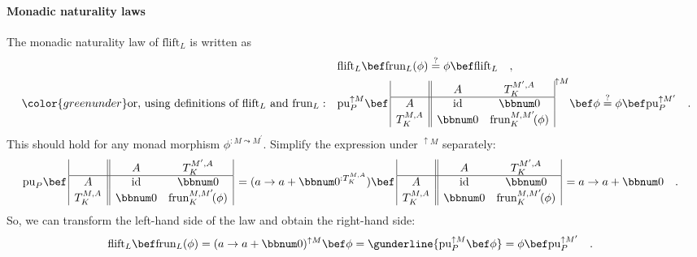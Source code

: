 \paragraph{Monadic naturality laws}

The monadic naturality law of $\text{flift}_{L}$ is written as
\begin{align*}
 & \text{flift}_{L}\bef\text{frun}_{L}(\phi)\overset{?}{=}\phi\bef\text{flift}_{L}\quad,\\
{\color{greenunder}\text{or, using definitions of }\text{flift}_{L}\text{ and }\text{frun}_{L}:}\quad & \text{pu}_{P}^{\uparrow M}\bef\,\begin{array}{|c||cc|}
 & A & T_{K}^{M^{\prime},A}\\
\hline A & \text{id} & \bbnum 0\\
T_{K}^{M,A} & \bbnum 0 & \text{frun}_{K}^{M,M^{\prime}}\!(\phi)
\end{array}^{\uparrow M}\bef\phi\overset{?}{=}\phi\bef\text{pu}_{P}^{\uparrow M^{\prime}}\quad.
\end{align*}
This should hold for any monad morphism $\phi^{:M\leadsto M^{\prime}}$.
Simplify the expression under $^{\uparrow M}$ separately:
\begin{align*}
 & \text{pu}_{P}\bef\,\begin{array}{|c||cc|}
 & A & T_{K}^{M^{\prime},A}\\
\hline A & \text{id} & \bbnum 0\\
T_{K}^{M,A} & \bbnum 0 & \text{frun}_{K}^{M,M^{\prime}}\!(\phi)
\end{array}\,=(a\rightarrow a+\bbnum 0^{:T_{K}^{M,A}})\bef\,\begin{array}{|c||cc|}
 & A & T_{K}^{M^{\prime},A}\\
\hline A & \text{id} & \bbnum 0\\
T_{K}^{M,A} & \bbnum 0 & \text{frun}_{K}^{M,M^{\prime}}\!(\phi)
\end{array}\,=a\rightarrow a+\bbnum 0\quad.
\end{align*}
So, we can transform the left-hand side of the law and obtain the
right-hand side:
\begin{align*}
 & \text{flift}_{L}\bef\text{frun}_{L}(\phi)=(a\rightarrow a+\bbnum 0)^{\uparrow M}\bef\phi=\gunderline{\text{pu}_{P}^{\uparrow M}\bef\phi}=\phi\bef\text{pu}_{P}^{\uparrow M^{\prime}}\quad.
\end{align*}

